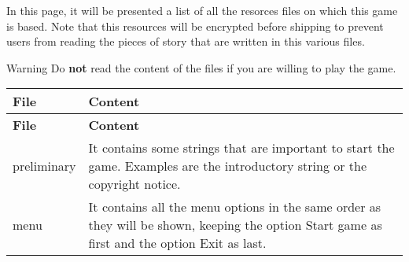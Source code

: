 In this page, it will be presented a list of all the resorces files on which this game is based. Note that this resources will be encrypted before shipping to prevent users from reading the pieces of story that are written in this various files.

\begin{DoxyWarning}{Warning}
Do {\bfseries{not}} read the content of the files if you are willing to play the game.
\end{DoxyWarning}
\tabulinesep=1mm
\begin{longtabu}spread 0pt [c]{*{2}{|X[-1]}|}
\hline
\cellcolor{\tableheadbgcolor}\textbf{ File  }&\cellcolor{\tableheadbgcolor}\textbf{ Content   }\\
\endfirsthead
\hline
\endfoot
\hline
\cellcolor{\tableheadbgcolor}\textbf{ File  }&\cellcolor{\tableheadbgcolor}\textbf{ Content   }\\
\endhead
{\ttfamily preliminary}  &It contains some strings that are important to start the game. Examples are the introductory string or the copyright notice.   \\
{\ttfamily menu}  &It contains all the menu options in the same order as they will be shown, keeping the option {\ttfamily Start game} as first and the option {\ttfamily Exit} as last.   \\
\end{longtabu}
